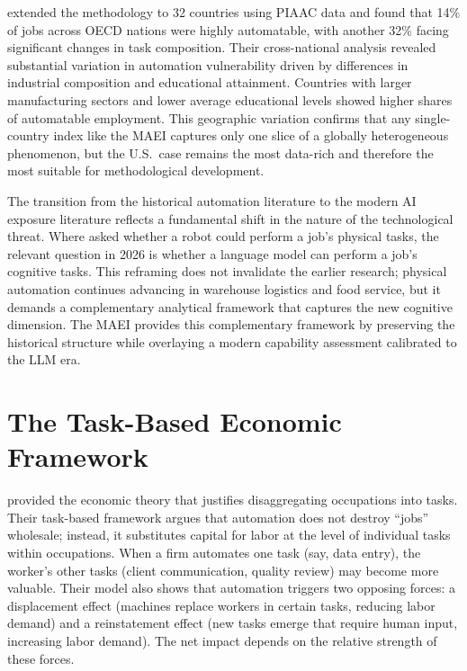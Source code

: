 \citet{Nedelkoska_Quintini_2018} extended the \citet{Arntz_Gregory_Zierahn_2016} methodology to 32 countries using PIAAC data and found that 14\% of jobs across OECD nations were highly automatable, with another 32\% facing significant changes in task composition. Their cross-national analysis revealed substantial variation in automation vulnerability driven by differences in industrial composition and educational attainment. Countries with larger manufacturing sectors and lower average educational levels showed higher shares of automatable employment. This geographic variation confirms that any single-country index like the MAEI captures only one slice of a globally heterogeneous phenomenon, but the U.S.\ case remains the most data-rich and therefore the most suitable for methodological development.

The transition from the historical automation literature to the modern AI exposure literature reflects a fundamental shift in the nature of the technological threat. Where \citet{Frey_Osborne_2017} asked whether a robot could perform a job's physical tasks, the relevant question in 2026 is whether a language model can perform a job's cognitive tasks. This reframing does not invalidate the earlier research; physical automation continues advancing in warehouse logistics and food service, but it demands a complementary analytical framework that captures the new cognitive dimension. The MAEI provides this complementary framework by preserving the historical structure while overlaying a modern capability assessment calibrated to the LLM era.

\section{The Task-Based Economic Framework}
\label{sec:task-based}

\citet{Acemoglu_Restrepo_2018, Acemoglu_Restrepo_2019} provided the economic theory that justifies disaggregating occupations into tasks. Their task-based framework argues that automation does not destroy ``jobs'' wholesale; instead, it substitutes capital for labor at the level of individual tasks within occupations. When a firm automates one task (say, data entry), the worker's other tasks (client communication, quality review) may become more valuable. Their model also shows that automation triggers two opposing forces: a displacement effect (machines replace workers in certain tasks, reducing labor demand) and a reinstatement effect (new tasks emerge that require human input, increasing labor demand). The net impact depends on the relative strength of these forces.

